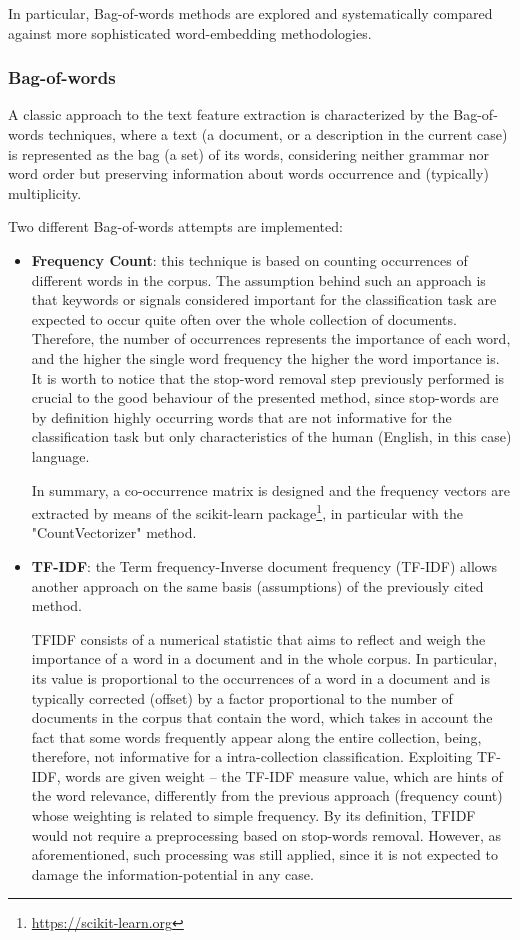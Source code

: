 \documentclass[10pt]{article}
\begin{document}
In particular, Bag-of-words methods are explored and systematically compared against more sophisticated word-embedding methodologies.

\subsubsection{Bag-of-words \label{subsubsec:bow}}

A classic approach to the text feature extraction is characterized by the Bag-of-words techniques, where a text (a document, or a description in the current case) is represented as the bag (a set) of its words, considering neither grammar nor word order but preserving information about words occurrence and (typically) multiplicity.

Two different Bag-of-words attempts are implemented:
\begin{itemize}
\item \textbf{Frequency Count}: this technique is based on counting occurrences of different words in the corpus. 
The assumption behind such an approach is that keywords or signals considered important for the classification task are expected to occur quite often over the whole collection of documents. 
Therefore, the number of occurrences represents the importance of each word, and the higher the single word frequency the higher the word importance is.
It is worth to notice that the stop-word removal step previously performed is crucial to the good behaviour of the presented method, since stop-words are by definition highly occurring words that are not informative for the classification task but only characteristics of the human (English, in this case) language.

In summary, a co-occurrence matrix is designed and the frequency vectors are extracted by means of the scikit-learn package\footnote{\url{https://scikit-learn.org}}, in particular with the "CountVectorizer" method. 

\item \textbf{TF-IDF}: the Term frequency-Inverse document frequency (TF-IDF) allows another approach on the same basis (assumptions) of the previously cited method.

TFIDF consists of a numerical statistic that aims to reflect and weigh the importance of a word in a document and in the whole corpus.
In particular, its value is proportional to the occurrences of a word in a document and is typically corrected (offset) by a factor proportional to the number of documents in the corpus that contain the word, which takes in account the fact that some words frequently appear along the entire collection, being, therefore, not informative for a intra-collection classification.
Exploiting TF-IDF, words are given weight – the TF-IDF measure value, which are hints of the word relevance, differently from the previous approach (frequency count) whose weighting is related to simple frequency. 
By its definition, TFIDF would not require a preprocessing based on stop-words removal. However, as aforementioned, such processing was still applied, since it is not expected to damage the information-potential in any case.


\end{itemize}
\end{document}
